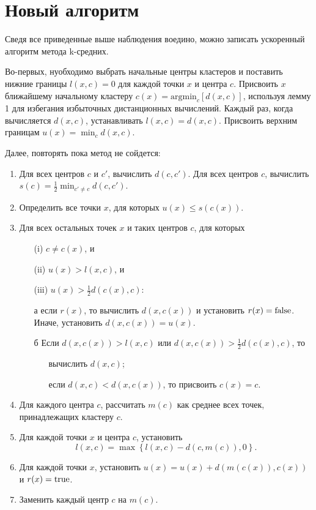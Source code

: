 \chapter{Новый алгоритм}
Сведя все приведенные выше наблюдения воедино, можно записать ускоренный алгоритм метода k-средних.

Во-первых, нуобходимо выбрать начальные центры кластеров и поставить нижние границы \( l(x, c) = 0 \) для каждой точки \( x \) и центра \( c \). Присвоить \( x \) ближайшему начальному кластеру \( c(x) = \mathrm{argmin}_c \left[d(x, c)\right] \), используя лемму 1 для избегания избыточных дистанционных вычислений. Каждый раз, когда вычисляется \( d(x, c) \), устанавливать \( l(x, c) = d(x, c) \). Присвоить верхним границам \( u(x) = \min_c d(x, c) \).

Далее, повторять пока метод не сойдется:
\begin{enumerate} \itemsep-2pt
  \item Для всех центров \( c \) и \( c' \), вычислить \( d(c, c') \). Для всех центров \( c \), вычислить \( s(c) = \frac{1}{2} \min_{c'\ne c}d(c, c') \).
  \item Определить все точки \( x \), для которых \( u(x) \le s(c(x)) \).
  \item Для всех остальных точек \( x \) и таких центров \( c \), для которых
     \begin{enumerate} \itemsep-1.5pt
       \item[(i)] \( c \ne c(x) \), и
       \item[(ii)] \( u(x) > l(x, c) \), и
       \item[(iii)] \( u(x) > \frac{1}{2} d(c(x), c) \):
     \end{enumerate}
     \begin{enumerate} \itemsep-1.5pt
       \item[а] если \( r(x) \), то вычислить \( d(x, c(x)) \) и установить \( r(x) = \mathrm{false} \). Иначе, установить \( d(x, c(x)) = u(x) \).
       \item[б] Если \( d(x, c(x)) > l(x, c) \) или \( d(x, c(x)) > \frac{1}{2} d(c(x), c) \), то
         \begin{itemize} \itemsep-1.5pt
           \item[ ] вычислить \( d(x, c) \);
           \item[ ] если \( d(x, c) < d(x, c(x)) \), то присвоить \( c(x) = c \).
         \end{itemize}
     \end{enumerate}
  \item Для каждого центра \( c \), рассчитать \( m(c) \) как среднее всех точек, принадлежащих кластеру \( c \).

  \item Для каждой точки \( x \) и центра \( c \), установить
    \[
      l(x, c) = \max\left\{l(x, c) - d(c, m(c)), 0\right\}.
    \]

  \item Для каждой точки \( x \), установить \( u(x) = u(x) + d(m(c(x)), c(x)) \) и \( r(x) = \mathrm{true} \).

  \item Заменить каждый центр \( c \) на \( m(c) \).
\end{enumerate}

